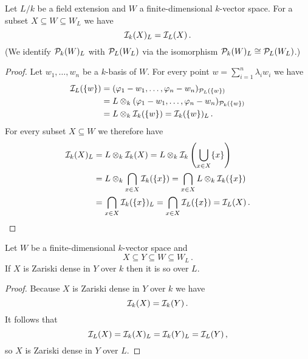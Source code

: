 \begin{lemma}
  Let $L/k$ be a field extension and $W$ a finite-dimensional $k$-vector space.
  For a subset $X \subseteq W \subseteq W_L$ we have
  \[
      \mathcal{I}_k(X)_L
    = \mathcal{I}_L(X) \,.
  \]
  (We identify $\mathcal{P}_k(W)_L$ with $\mathcal{P}_L(W_L)$ via the isomorphism $\mathcal{P}_k(W)_L \cong \mathcal{P}_L(W_L)$.)
\end{lemma}
\begin{proof}
  Let $w_1, \dotsc, w_n$ be a $k$-basis of $W$.
  For every point $w = \sum_{i=1}^n \lambda_i w_i$ we have
  \begin{align*}
        \mathcal{I}_L(\{w\})
    &=  ( \varphi_1 - w_1, \dotsc, \varphi_n - w_n )_{ \mathcal{P}_L(\{w\}) } \\
    &=  L \otimes_k ( \varphi_1 - w_1, \dotsc, \varphi_n - w_n )_{ \mathcal{P}_k(\{w\}) } \\
    &=  L \otimes_k \mathcal{I}_k(\{w\})
     =  \mathcal{I}_k(\{w\})_L \,.
  \end{align*}
  For every subset $X \subseteq W$ we therefore have
  \begin{align*}
        \mathcal{I}_k(X)_L
    &=  L \otimes_k \mathcal{I}_k(X)
     =  L \otimes_k \mathcal{I}_k\left( \bigcup_{x \in X} \{x\} \right) \\
    &=  L \otimes_k \bigcap_{x \in X} \mathcal{I}_k(\{x\})
     =  \bigcap_{x \in X} L \otimes_k \mathcal{I}_k(\{x\}) \\
    &=  \bigcap_{x \in X} \mathcal{I}_k(\{x\})_L
     =  \bigcap_{x \in X} \mathcal{I}_L(\{x\})
     =  \mathcal{I}_L(X) \,.
    \qedhere
  \end{align*}
\end{proof}


\begin{corollary}\label{corollary: Zariski dense scalar extension}
  Let $W$ be a finite-dimensional $k$-vector space and
  \[
              X
    \subseteq Y
    \subseteq W
    \subseteq W_L \,.
  \]
  If $X$ is Zariski dense in $Y$ over $k$ then it is so over $L$.
\end{corollary}
\begin{proof}
  Because $X$ is Zariski dense in $Y$ over $k$ we have
  \[
      \mathcal{I}_k(X)
    = \mathcal{I}_k(Y) \,.
  \]
  It follows that
  \[
      \mathcal{I}_L(X)
    = \mathcal{I}_k(X)_L
    = \mathcal{I}_k(Y)_L
    = \mathcal{I}_L(Y) \,,
  \]
  so $X$ is Zariski dense in $Y$ over $L$.
\end{proof}


